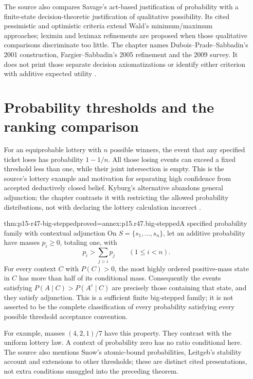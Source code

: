 The source also compares Savage's act-based justification of probability
with a finite-state decision-theoretic justification of qualitative
possibility. Its cited pessimistic and optimistic criteria extend Wald's
minimum/maximum approaches; leximin and leximax refinements are proposed
when those qualitative comparisons discriminate too little. The chapter
names Dubois--Prade--Sabbadin's 2001 construction, Fargier--Sabbadin's 2005
refinement and the 2009 survey. It does not print those separate decision
axiomatizations or identify either criterion with additive expected utility
\cite[p.~308]{DuboisPrade2021RepresentingBelief}.

\section{Probability thresholds and the ranking comparison}

For an equiprobable lottery with \(n\) possible winners, the event that any
specified ticket loses has probability \(1-1/n\). All those losing events
can exceed a fixed threshold less than one, while their joint intersection
is empty. This is the source's lottery example and motivation for separating
high confidence from accepted deductively closed belief. Kyburg's alternative
abandons general adjunction; the chapter contrasts it with restricting the
allowed probability distributions, not with declaring the lottery calculation
incorrect \cite[\S2.4]{DuboisPrade2021RepresentingBelief}.

\begin{hbtheorem}{thm:p15-r47-big-stepped}{proved=annex:p15.r47.big-stepped}{A specified probability family with contextual adjunction}
On \(S=\{s_1,\ldots,s_n\}\), let an additive probability have masses
\(p_i\geq0\), totaling one, with
\[
 p_i>\sum_{j>i}p_j\qquad(1\leq i<n).
\]
For every context \(C\) with \(P(C)>0\), the most highly ordered
positive-mass state in \(C\) has more than half of its conditional mass.
Consequently the events satisfying \(P(A\mid C)>P(A^c\mid C)\)
are precisely those containing that state, and they satisfy adjunction.
This is a sufficient finite big-stepped family; it is not asserted to be
the complete classification of every probability satisfying every possible
threshold acceptance convention.
\end{hbtheorem}

For example, masses \((4,2,1)/7\) have this property. They contrast with
the uniform lottery law. A context of probability zero has no ratio
conditional here. The source also mentions Snow's atomic-bound probabilities,
Leitgeb's stability account and extensions to other thresholds; these are
distinct cited presentations, not extra conditions smuggled into the
preceding theorem.

